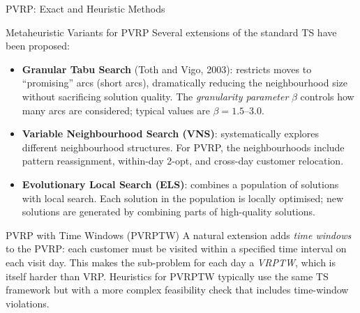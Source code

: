 \documentclass[aspectratio=169,10pt]{beamer}
\begin{document}
\begin{frame}[allowframebreaks]{PVRP: Exact and Heuristic Methods}
\begin{block}{Metaheuristic Variants for PVRP}
  Several extensions of the standard TS have been proposed:
  \begin{itemize}
    \item \textbf{Granular Tabu Search} (Toth and Vigo, 2003): restricts
          moves to ``promising'' arcs (short arcs), dramatically reducing
          the neighbourhood size without sacrificing solution quality.  The
          \emph{granularity parameter} $\beta$ controls how many arcs are
          considered; typical values are $\beta = 1.5$--$3.0$.
    \item \textbf{Variable Neighbourhood Search (VNS)}: systematically
          explores different neighbourhood structures.  For PVRP, the
          neighbourhoods include pattern reassignment, within-day 2-opt,
          and cross-day customer relocation.
    \item \textbf{Evolutionary Local Search (ELS)}: combines a population
          of solutions with local search.  Each solution in the population
          is locally optimised; new solutions are generated by combining
          parts of high-quality solutions.
  \end{itemize}
\end{block}

\begin{block}{PVRP with Time Windows (PVRPTW)}
  A natural extension adds \emph{time windows} to the PVRP: each customer
  must be visited within a specified time interval on each visit day.  This
  makes the sub-problem for each day a \emph{VRPTW}, which is itself harder
  than VRP.  Heuristics for PVRPTW typically use the same TS framework but
  with a more complex feasibility check that includes time-window violations.
\end{block}

\end{frame}
\end{document}
